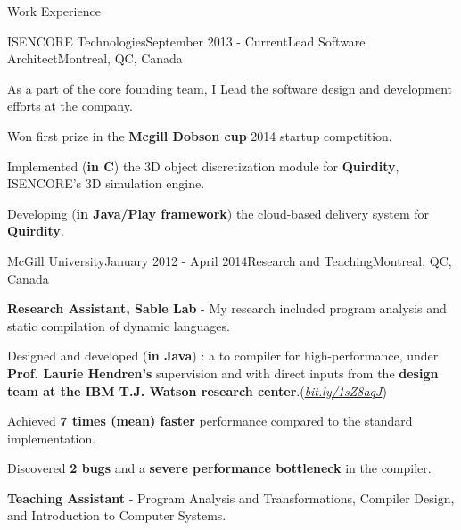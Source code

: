 \documentclass{resume} %
\begin{document}
\begin{rSection}{Work Experience}

\begin{rSubsection}{ISENCORE Technologies}{September 2013 - Current}{Lead
  Software Architect}{Montreal, QC, Canada}
\item As a part of the core founding team, I Lead the software design and development efforts at the company.

\begin{lsubSubsection}
\item Won first prize in the \textbf{Mcgill Dobson cup} 2014 startup competition. 
\item Implemented (\textbf{in C}) the 3D object discretization module for \textbf{Quirdity},
  ISENCORE's 3D simulation engine.
\item Developing (\textbf{in Java/Play framework}) the cloud-based delivery system for \textbf{Quirdity}.
\end{lsubSubsection}
\end{rSubsection}

\begin{rSubsection}{McGill University}{January 2012 - April 2014}{Research and
Teaching}{Montreal, QC, Canada} 
\item \textbf{Research Assistant, Sable Lab} - My research included program
analysis and static compilation of dynamic languages.

\begin{lsubSubsection}
  \item Designed and developed (\textbf{in Java}) \mixtenx: a {\matlab to
\xten compiler for high-performance}, under \textbf{Prof.
Laurie Hendren's} supervision and with direct inputs from the \textbf{\xten
design team at the IBM T.J. Watson research
center}.(\href{http://bit.ly/1sZ8aqJ}{\em{bit.ly/1sZ8aqJ}})  
 \item Achieved \textbf{7 times (mean) faster} performance compared to the
 standard \matlab implementation.
  \item Discovered \textbf{2 bugs} and a \textbf{severe performance bottleneck}
in the \xten compiler.  
\end{lsubSubsection}
\item \textbf{Teaching Assistant} - Program Analysis and Transformations,
	Compiler Design, and Introduction to Computer Systems.
\end{rSubsection}


\end{rSection}
\end{document}
